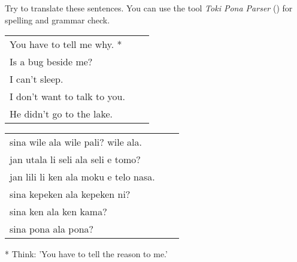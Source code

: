 Try to translate these sentences. 
You can use the tool \textit{Toki Pona Parser} (\cite{www:rowa:02}) for spelling and grammar check. 

\begin{supertabular}{p{5,5cm}|ll}
You have to tell me why. *  &&   \\ %
Is a bug beside me?  &&    \\ %
I can't sleep.  &&    \\ %
I don't want to talk to you.  &&    \\ %
He didn't go to the lake.   &&   \\ %
\end{supertabular}

\begin{supertabular}{p{5,5cm}|ll}
sina wile ala wile pali? wile ala.  &&    \\ %
jan utala li seli ala seli e tomo?   &&   \\ %
jan lili li ken ala moku e telo nasa.   &&   \\ %
sina kepeken ala kepeken ni?  &&    \\ %
sina ken ala ken kama?   &&   \\ %
sina pona ala pona? &&   \\ %
\end{supertabular} 

* Think: 'You have to tell the reason to me.' 
